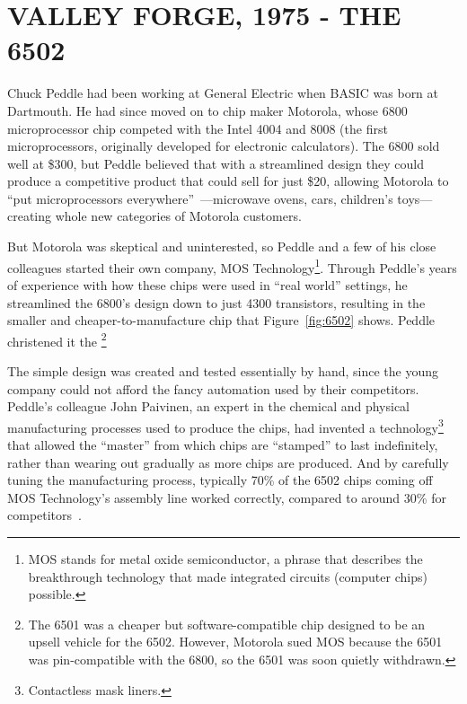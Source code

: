 
\section{VALLEY FORGE, 1975 - THE 6502}

Chuck Peddle had been working at General Electric when BASIC was
born at Dartmouth.  He had since moved on to chip maker Motorola, whose 6800
microprocessor chip competed with the Intel 4004 and
8008 (the first microprocessors, originally developed for
electronic calculators).  The 6800 sold well at \$300, but
Peddle  believed that with a streamlined design they could
produce a competitive product that could sell for just \$20,
allowing Motorola to ``put
microprocessors everywhere''~\cite[p. 31]{commodore}---microwave ovens,
cars, children's toys---creating whole new categories of Motorola customers.

But Motorola was skeptical and uninterested, so Peddle and a few of his close
colleagues started their own company, MOS Technology\footnote{MOS stands
  for metal oxide 
semiconductor, a phrase that describes the breakthrough technology that
made integrated circuits (computer chips) possible.}.
Through Peddle's years
of experience with how these chips were used in ``real world'' settings,
he streamlined the 6800's design 
down to just 4300 transistors, resulting in the smaller and
cheaper-to-manufacture chip that Figure~\ref{fig:6502} shows.  Peddle
christened it the \footnote{The 6501 was a
  cheaper but software-compatible chip designed to be an upsell
  vehicle for the 6502. However, Motorola sued MOS because the 6501 was
  pin-compatible with the 6800, so the 6501 was soon quietly withdrawn.}


The simple design was created and tested essentially by hand,
since the young company could not afford the
fancy automation used by their competitors.
Peddle's colleague John Paivinen, an expert in the chemical
and physical manufacturing processes used to produce the chips, had
invented a technology\footnote{Contactless mask liners.} that allowed
the ``master'' from which chips are ``stamped'' to last indefinitely,
rather than wearing out gradually as more chips are produced.
And by carefully tuning the manufacturing process,
typically 70\% of the 6502 chips coming off MOS Technology's assembly
line worked correctly, compared to around 30\% for competitors~\cite{commodore}.

